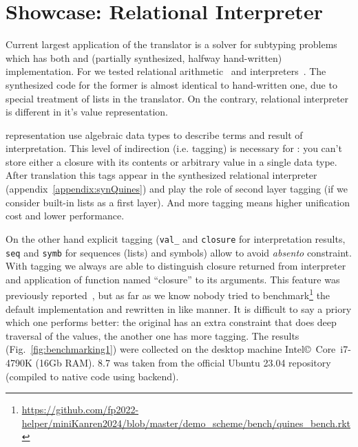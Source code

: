 
\section{Showcase: Relational Interpreter}
\label{sec:interpreter}

Current largest application of the translator is a solver for \Java{} subtyping problems~\cite{JavaGenericsSolver2023} which has both \OCaml{} and (partially synthesized, halfway hand-written) \Kotlin{} implementation.
For \Scheme{} we tested relational arithmetic~\cite{Kiselyov2008PureDA} and interpreters~\cite{Untagged}.
The synthesized code for the former is almost identical to hand-written one, due to special treatment of lists in the translator.
On the contrary, relational interpreter is different in it's value representation.

\OCanren{} representation use algebraic data types to describe terms and result of interpretation.
This level of indirection (i.e. tagging) is necessary for \OCaml{}: you can't store either a closure with its contents or arbitrary value in a single data type.
After translation this tags appear in the synthesized relational interpreter (appendix~\ref{appendix:synQuines}) and play the role of second layer tagging (if we consider built-in \Scheme{} lists as a first layer).
And more tagging means higher unification cost and lower performance.

On the other hand explicit tagging (\texttt{val\_} and \verb=closure= for interpretation results, \verb=seq= and \verb=symb= for sequences (lists) and symbols) allow to avoid \emph{absento} constraint.
With tagging we always are able to distinguish closure returned from interpreter and application of function named ``closure'' to its arguments.
This feature was previously reported~\cite{OCanren}, but as far as we know nobody tried to benchmark\footnote{\url{https://github.com/fp2022-helper/miniKanren2024/blob/master/demo_scheme/bench/quines_bench.rkt}} the default \Scheme{} implementation and rewritten in \OCanren{} like manner.
It is difficult to say a priory which one performs better: the original has an extra constraint that does deep traversal of the values, the another one has more tagging.
The results (Fig.~\ref{fig:benchmarking1}) were collected  on the desktop machine Intel\copyright~Core\texttrademark~i7-4790K (16Gb RAM).
\Racket{} 8.7 was taken from the official Ubuntu 23.04 repository (compiled to native code using \Chez{} backend).


